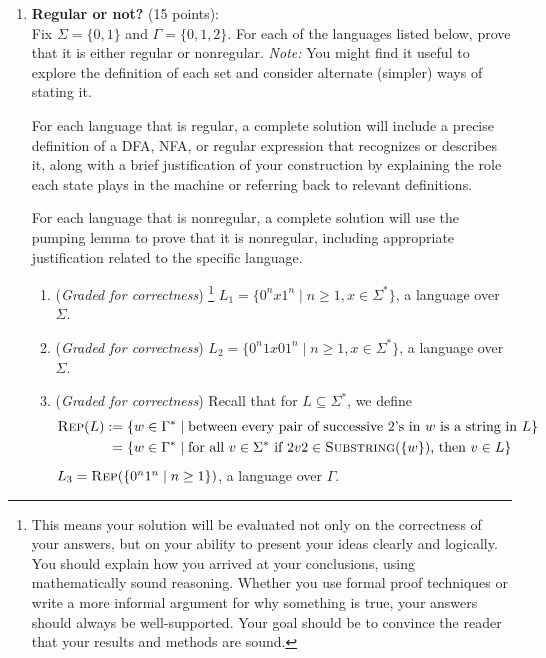 \documentclass[12pt, oneside]{article}
\newcommand{\gradeCorrect}{({\it Graded for correctness}) }
\newcommand{\gradeCorrectFirst}{\gradeCorrect\footnote{This means your solution 
will be evaluated not only on the correctness of your answers, but on your ability
to present your ideas clearly and logically. You should explain how you 
arrived at your conclusions, using
mathematically sound reasoning. Whether you use formal proof techniques or 
write a more informal argument
for why something is true, your answers should always be well-supported. 
Your goal should be to convince the
reader that your results and methods are sound.} }
\newcommand{\SUBSTRING}{\textsc{Substring}}
\newcommand{\REP}{\textsc{Rep}}
\begin{document}
\begin{enumerate} 



\item \textbf{Regular or not?} (15 points):\\
Fix $\Sigma = \{0,1\}$ and $\Gamma = \{0,1,2\}$.
For each of the languages listed below, 
prove that it is either regular or nonregular. {\it Note:} You might find it useful to 
explore the definition of each set and 
consider alternate (simpler) ways of stating it.

For each language that is regular, a complete 
solution will include a 
precise definition of a DFA, NFA, or regular 
expression that recognizes or describes it, along 
with a brief justification
of your construction by explaining the role each 
state plays in the machine
or referring back to relevant definitions.

For each language that is nonregular, a complete
solution will use the pumping lemma to prove that it is nonregular, 
including appropriate
justification related to the specific language.

\begin{enumerate}
    \item\gradeCorrectFirst $L_1 = \{0^n x 1^n \mid n \ge 1, x \in \Sigma^*\}$, a language over $\Sigma$.
    \item\gradeCorrect $L_2 = \{0^n 1 x 0 1^n \mid n 
    \ge 1, x \in \Sigma^* \}$, a language over 
    $\Sigma$.
    \item\gradeCorrect 
    Recall that for $L \subseteq \Sigma^*$, we define
    \begin{align*}
    \REP(L) &:= \{ w \in \Gamma^* \mid \text{between every pair of successive $2$'s in $w$ is a string in $L$}\}\\
    &\phantom{:}=\{w \in \Gamma^* \mid \text{for all } v \in \Sigma^* \text{ if } 2v2 \in \SUBSTRING(\{w\})  \text{, then } v \in L\} 
    \end{align*}
    $L_3 = \REP( \{ 0^n 1^n \mid n \geq 1 \} )$, 
    a language over $\Gamma$.
\end{enumerate}





\end{enumerate}
\end{document}
